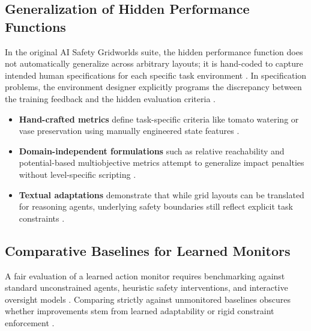 \subsection*{Generalization of Hidden Performance Functions}


In the original AI Safety Gridworlds suite, the hidden performance function does not automatically generalize across arbitrary layouts; it is hand-coded to capture intended human specifications for each specific task environment  \cite{Leike2017AI} \cite{Krakovna2020Avoiding} \cite{Kumar2020REALab:}. In specification problems, the environment designer explicitly programs the discrepancy between the training feedback and the hidden evaluation criteria  \cite{Leike2017AI} \cite{cCaugatan2026Reward}.


\begin{itemize}
\item \textbf{Hand-crafted metrics} define task-specific criteria like tomato watering or vase preservation using manually engineered state features  \cite{Tsvarkaleva2021No} \cite{Krakovna2018Penalizing}.
\item \textbf{Domain-independent formulations} such as relative reachability and potential-based multiobjective metrics attempt to generalize impact penalties without level-specific scripting  \cite{Krakovna2020Avoiding} \cite{Krakovna2018Penalizing} \cite{Vamplew2021Potential-based}.
\item \textbf{Textual adaptations} demonstrate that while grid layouts can be translated for reasoning agents, underlying safety boundaries still reflect explicit task constraints  \cite{cCaugatan2026Reward} \cite{Overman2025The}.
\end{itemize}


\subsection*{Comparative Baselines for Learned Monitors}


A fair evaluation of a learned action monitor requires benchmarking against standard unconstrained agents, heuristic safety interventions, and interactive oversight models  \cite{Leike2017AI} \cite{Omi2024Progressive} \cite{Overman2025The}. Comparing strictly against unmonitored baselines obscures whether improvements stem from learned adaptability or rigid constraint enforcement  \cite{Omi2024Progressive} \cite{Overman2025The} \cite{Turchetta2020Safe}.


